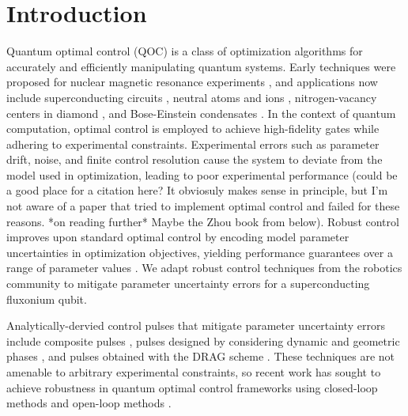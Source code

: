 \section{Introduction}
Quantum optimal control (QOC) is a class of optimization
algorithms for accurately and efficiently manipulating quantum systems.
Early techniques were proposed for nuclear magnetic resonance experiments
\cite{vandersypen2005nmr, kehlet2004improving, khaneja2005optimal,
  maximov2008optimal, nielsen2010optimal, skinner2003application, tosner2009optimal},
and applications now include superconducting circuits \cite{abdelhafez2020universal,
  chakram2020multimode, fisher2010optimal, gokhale2019partial,
  leng2019robust, leung2017speedup, li2020fast},
neutral atoms and ions \cite{brouzos2015quantum,
  de2008optimal, goerz2011quantum, guo2019high, jensen2019time,
  larrouy2020fast, omran2019generation, rosi2013fast, sorensen2019qengine,
  treutlein2006microwave, van2016optimal},
nitrogen-vacancy centers in diamond \cite{chou2015optimal,
  dolde2014high, geng2016experimental,
  nobauer2015smooth, poggiali2018optimal, rembold2020introduction, tian2019optimal},
and Bose-Einstein condensates \cite{amri2019optimal, sorensen2018quantum}.
In the context of quantum computation,
optimal control is employed to achieve high-fidelity gates
while adhering to experimental constraints.
Experimental errors such as parameter drift, noise, and
finite control resolution cause the system to deviate
from the model used in optimization, leading
to poor experimental performance (could be a good place for a citation here? It obviosuly makes sense in principle, but I'm not aware of a paper that tried to implement optimal control and failed for these reasons. *on reading further* Maybe the Zhou book from below).
Robust control improves upon
standard optimal control by encoding
model parameter uncertainties
in optimization objectives, yielding performance
guarantees over a range of parameter values \cite{Zhou97,Morimoto00,Manchester18}.
We adapt robust control techniques from the robotics community to mitigate
parameter uncertainty errors for
a superconducting fluxonium qubit.

Analytically-dervied control pulses that mitigate parameter uncertainty
errors include composite pulses \cite{cummins2000use, cummins2003tackling,
  kupce1995stretched, merrill2014progress},
pulses designed by considering dynamic and geometric phases
\cite{han2020experimental, xu2020nonadiabatic}, and
pulses obtained with the DRAG scheme \cite{motzoi2009simple}.
These techniques are not amenable to arbitrary experimental constraints,
so recent work has sought to achieve robustness in quantum optimal
control frameworks using closed-loop methods \cite{egger2014adaptive, feng2018gradient,
  wittler2020integrated} and open-loop methods \cite{
  allen2019robust, carvalho2020error, reinhold2019controlling,
  rembold2020introduction, kosut2013robust}.

